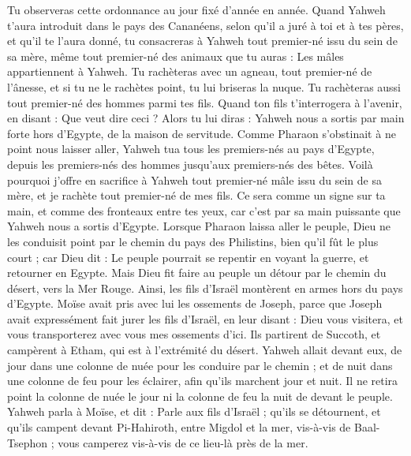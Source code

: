 \begin{multicols}{2}
Tu observeras cette ordonnance au jour fixé d’année en année.
Quand Yahweh t'aura introduit dans le pays des Cananéens, selon qu'il a juré à toi et à tes pères, et qu'il te l'aura donné,
tu consacreras à Yahweh tout premier-né issu du sein de sa mère, même tout premier-né des animaux que tu auras : Les mâles appartiennent à Yahweh.
Tu rachèteras avec un agneau, tout premier-né de l’ânesse, et si tu ne le rachètes point, tu lui briseras la nuque. Tu rachèteras aussi tout premier-né des hommes parmi tes fils.
Quand ton fils t'interrogera à l'avenir, en disant : Que veut dire ceci ? Alors tu lui diras : Yahweh nous a sortis par main forte hors d'Egypte, de la maison de servitude.
Comme Pharaon s’obstinait à ne point nous laisser aller, Yahweh tua tous les premiers-nés au pays d'Egypte, depuis les premiers-nés des hommes jusqu’aux premiers-nés des bêtes. Voilà pourquoi j’offre en sacrifice à Yahweh tout premier-né mâle issu du sein de sa mère, et je rachète tout premier-né de mes fils.
Ce sera comme un signe sur ta main, et comme des fronteaux entre tes yeux, car c’est par sa main puissante que Yahweh nous a sortis d'Egypte.
Lorsque Pharaon laissa aller le peuple, Dieu ne les conduisit point par le chemin du pays des Philistins, bien qu'il fût le plus court ; car Dieu dit : Le peuple pourrait se repentir en voyant la guerre, et retourner en Egypte.
Mais Dieu fit faire au peuple un détour par le chemin du désert, vers la Mer Rouge. Ainsi, les fils d'Israël montèrent en armes hors du pays d'Egypte.
Moïse avait pris avec lui les ossements de Joseph, parce que Joseph avait expressément fait jurer les fils d'Israël, en leur disant : Dieu vous visitera, et vous transporterez avec vous mes ossements d'ici.
Ils partirent de Succoth, et campèrent à Etham, qui est à l’extrémité du désert.
Yahweh allait devant eux, de jour dans une colonne de nuée pour les conduire par le chemin ; et de nuit dans une colonne de feu pour les éclairer, afin qu'ils marchent jour et nuit.
Il ne retira point la colonne de nuée le jour ni la colonne de feu la nuit de devant le peuple.
\VerseOne{}Yahweh parla à Moïse, et dit :
Parle aux fils d'Israël ; qu'ils se détournent, et qu'ils campent devant Pi-Hahiroth, entre Migdol et la mer, vis-à-vis de Baal-Tsephon ; vous camperez vis-à-vis de ce lieu-là près de la mer.

\end{multicols}
